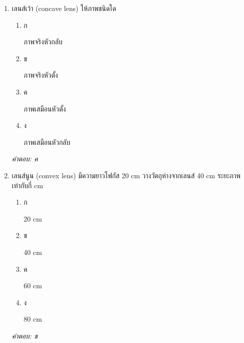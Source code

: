 \documentclass[12pt]{article}
\begin{document}
\begin{enumerate}[label=\arabic*., itemsep=0.5\baselineskip, topsep=0.5\baselineskip, leftmargin=*]
\item เลนส์เว้า (concave lens) ให้ภาพชนิดใด
\begin{enumerate}[label=\alph*)., itemsep=0.3\baselineskip, topsep=0.3\baselineskip]
\item ก\ 
\begin{minipage}[t]{0.9\linewidth}
\raggedright ภาพจริงหัวกลับ
\end{minipage}
\item ข\ 
\begin{minipage}[t]{0.9\linewidth}
\raggedright ภาพจริงหัวตั้ง
\end{minipage}
\item ค\ 
\begin{minipage}[t]{0.9\linewidth}
\raggedright ภาพเสมือนหัวตั้ง
\end{minipage}
\item ง\ 
\begin{minipage}[t]{0.9\linewidth}
\raggedright ภาพเสมือนหัวกลับ
\end{minipage}
\end{enumerate}
\vspace{-0.3\baselineskip}
\begin{small}
\textit{คำตอบ: ค}
\end{small}

\item เลนส์นูน (convex lens) มีความยาวโฟกัส 20 cm วางวัตถุห่างจากเลนส์ 40 cm ระยะภาพเท่ากับกี่ cm
\begin{enumerate}[label=\alph*)., itemsep=0.3\baselineskip, topsep=0.3\baselineskip]
\item ก\ 
\begin{minipage}[t]{0.9\linewidth}
\raggedright 20 cm
\end{minipage}
\item ข\ 
\begin{minipage}[t]{0.9\linewidth}
\raggedright 40 cm
\end{minipage}
\item ค\ 
\begin{minipage}[t]{0.9\linewidth}
\raggedright 60 cm
\end{minipage}
\item ง\ 
\begin{minipage}[t]{0.9\linewidth}
\raggedright 80 cm
\end{minipage}
\end{enumerate}
\vspace{-0.3\baselineskip}
\begin{small}
\textit{คำตอบ: ข}
\end{small}


\end{enumerate}
\end{document}
